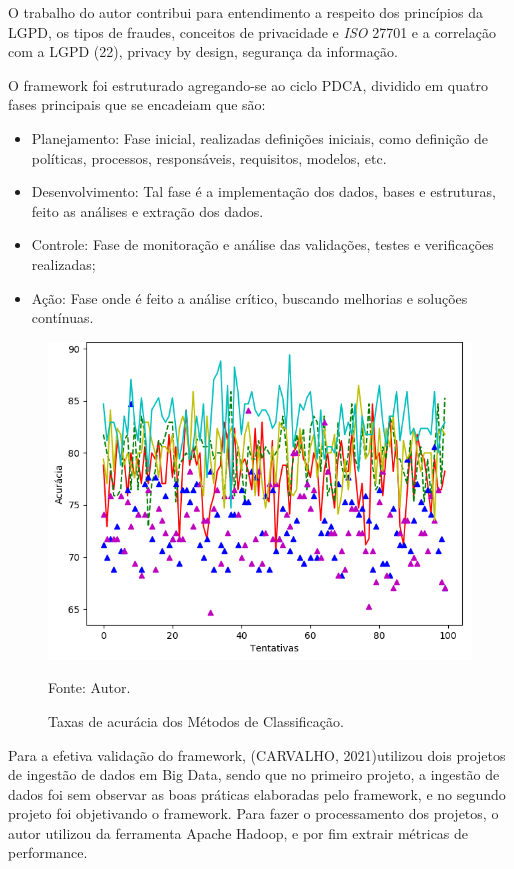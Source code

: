 \documentclass[
	12pt,				%
	openright,			%
	oneside,			%
	a4paper,			%
	english,			%
	french,				%
	spanish,			%
	brazil,				%
	]{abntex2}
\begin{document}
O trabalho do autor contribui para entendimento a respeito dos princípios da LGPD, os tipos de fraudes, conceitos de privacidade e \textit{ISO} 27701 e a correlação com a LGPD (22), privacy by design, segurança da informação.

O framework foi estruturado agregando-se ao ciclo PDCA, dividido em quatro fases principais que se encadeiam que são:

\begin{itemize}
\item Planejamento: Fase inicial, realizadas definições iniciais, como definição de políticas, processos, responsáveis, requisitos, modelos, etc.
\item Desenvolvimento: Tal fase é a implementação dos dados, bases e estruturas, feito as análises e extração dos dados.
\item Controle: Fase de monitoração e análise das validações, testes e verificações realizadas;
\item Ação: Fase onde é feito a análise crítico, buscando melhorias e soluções contínuas.
\end{itemize}

\begin{figure}[ht]
    \centering
    \caption{Taxas de acurácia dos Métodos de Classificação.}
    \includegraphics[width=5.0in]{Images/acc-classification.png}
    \label{fig: grafico-acc}
    
    \centering \small Fonte: Autor.
\end{figure}

Para a efetiva validação do framework, (CARVALHO, 2021)utilizou dois projetos de ingestão de dados em Big Data, sendo que no primeiro projeto, a ingestão de dados foi sem observar as boas práticas elaboradas pelo framework, e no segundo projeto foi objetivando o framework. Para fazer o processamento dos projetos, o autor utilizou da ferramenta Apache Hadoop, e por fim extrair métricas de performance.
\end{document}
